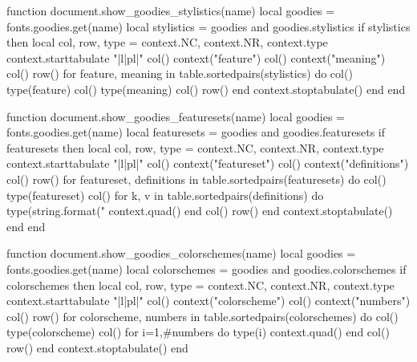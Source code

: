 
\startluacode

    function document.show_goodies_stylistics(name)
        local goodies = fonts.goodies.get(name)
        local stylistics = goodies and goodies.stylistics
        if stylistics then
            local col, row, type = context.NC, context.NR, context.type
            context.starttabulate { "|l|pl|" }
            col() context("feature") col() context("meaning") col() row()
            for feature, meaning in table.sortedpairs(stylistics) do
                col() type(feature) col() type(meaning) col() row()
            end
            context.stoptabulate()
        end
    end

    function document.show_goodies_featuresets(name)
        local goodies = fonts.goodies.get(name)
        local featuresets = goodies and goodies.featuresets
        if featuresets then
            local col, row, type = context.NC, context.NR, context.type
            context.starttabulate { "|l|pl|" }
            col() context("featureset") col() context("definitions") col() row()
            for featureset, definitions in table.sortedpairs(featuresets) do
            col() type(featureset) col()
            for k, v in table.sortedpairs(definitions) do
                type(string.format("%
                context.quad()
            end
            col() row()
            end
            context.stoptabulate()
        end
    end

    function document.show_goodies_colorschemes(name)
        local goodies = fonts.goodies.get(name)
        local colorschemes = goodies and goodies.colorschemes
        if colorschemes then
            local col, row, type = context.NC, context.NR, context.type
            context.starttabulate { "|l|pl|" }
            col() context("colorscheme") col() context("numbers") col() row()
            for colorscheme, numbers in table.sortedpairs(colorschemes) do
                col() type(colorscheme) col()
                for i=1,#numbers do
                    type(i)
                    context.quad()
                end
                col() row()
            end
            context.stoptabulate()
        end

\stopluacode

\def\showgoodiesstylistics  #1{\ctxlua{document.show_goodies_stylistics  ("#1")}}
\def\showgoodiesfeaturesets #1{\ctxlua{document.show_goodies_featuresets ("#1")}}
\def\showgoodiescolorschemes#1{\ctxlua{document.show_goodies_colorschemes("#1")}}

\endinput
